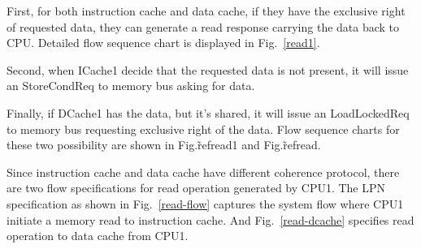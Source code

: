 \documentclass[conference]{IEEEtran}
\begin{document}
First, for both instruction cache and data cache, if they have the exclusive right of requested data, they can generate a read response carrying the data back to CPU. Detailed flow sequence chart is displayed in Fig.~\ref{read1}.

Second, when ICache1 decide that the requested data is not present, it will issue an StoreCondReq to memory bus asking for data. 

Finally, if DCache1 has the data, but it's shared, it will issue an LoadLockedReq to memory bus requesting exclusive right of the data. Flow sequence charts for these two possibility are shown in Fig.\~ref{read1} and Fig.\~ref{read}.
 
Since instruction cache and data cache have different coherence protocol, there are two flow specifications for read operation generated by CPU1. The LPN specification as shown in Fig.~\ref{read-flow} captures the system flow where CPU1 initiate a memory read to instruction cache. And Fig.~\ref{read-dcache} specifies read operation to data cache from CPU1.
\end{document}
